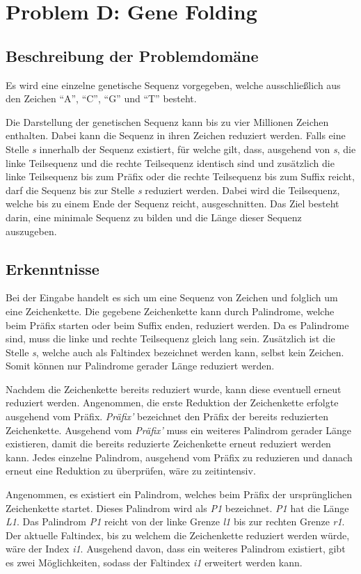 \newpage
\section{Problem D: Gene Folding}
\label{sec:Latex}
\subsection{Beschreibung der Problemdomäne}
\label{subsec:DokHeadGli}
Es wird eine einzelne genetische Sequenz vorgegeben, welche ausschließlich aus den Zeichen “A”, “C”, “G” und “T” besteht.

Die Darstellung der genetischen Sequenz kann bis zu vier Millionen Zeichen enthalten. Dabei kann die Sequenz in ihren Zeichen reduziert werden. Falls eine Stelle \textit{s} innerhalb der Sequenz existiert, für welche gilt, dass, ausgehend von \textit{s},  die linke Teilsequenz und die rechte Teilsequenz identisch sind und zusätzlich die linke Teilsequenz bis zum Präfix oder die rechte Teilsequenz bis zum Suffix reicht, darf die Sequenz bis zur Stelle \textit{s} reduziert werden. Dabei wird die Teilsequenz, welche bis zu einem Ende der Sequenz reicht, ausgeschnitten. Das Ziel besteht darin, eine minimale Sequenz zu bilden und die Länge dieser Sequenz auszugeben.
%
\subsection{Erkenntnisse}
\label{subsec:TextBefehle}
Bei der Eingabe handelt es sich um eine Sequenz von Zeichen und folglich um eine Zeichenkette. Die gegebene Zeichenkette kann durch Palindrome, welche beim Präfix starten oder beim Suffix enden, reduziert werden. Da es Palindrome sind, muss die linke und rechte Teilsequenz gleich lang sein. Zusätzlich ist die Stelle \textit{s}, welche auch als Faltindex bezeichnet werden kann, selbst kein Zeichen. Somit können nur Palindrome gerader Länge reduziert werden.

Nachdem die Zeichenkette bereits reduziert wurde, kann diese eventuell erneut reduziert werden. Angenommen, die erste Reduktion der Zeichenkette erfolgte ausgehend vom Präfix. \textit{Präfix’} bezeichnet den Präfix der bereits reduzierten Zeichenkette. Ausgehend vom \textit{Präfix’} muss ein weiteres Palindrom gerader Länge existieren, damit die bereits reduzierte Zeichenkette erneut reduziert werden kann. Jedes einzelne Palindrom, ausgehend vom Präfix zu reduzieren und danach erneut eine Reduktion zu überprüfen, wäre zu zeitintensiv. 

Angenommen, es existiert ein Palindrom, welches beim Präfix der ursprünglichen Zeichenkette startet. Dieses Palindrom wird als \textit{P1} bezeichnet. \textit{P1} hat die Länge \textit{L1}. Das Palindrom \textit{P1} reicht von der linke Grenze \textit{l1} bis zur rechten Grenze \textit{r1}. Der aktuelle Faltindex, bis zu welchem die Zeichenkette reduziert werden würde, wäre der Index \textit{i1}. Ausgehend davon, dass ein weiteres Palindrom existiert, gibt es zwei Möglichkeiten, sodass der Faltindex \textit{i1} erweitert werden kann.

